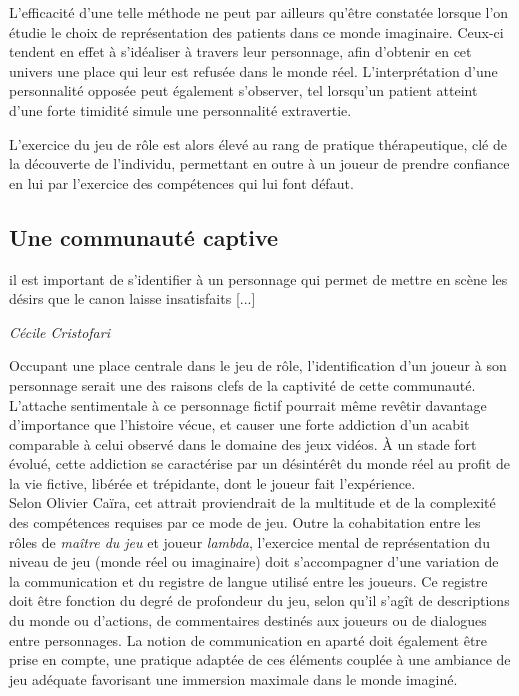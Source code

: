 L'efficacité d'une telle méthode ne peut par ailleurs qu'être constatée lorsque l'on étudie le choix de représentation des patients dans ce monde imaginaire. Ceux-ci tendent en effet à s'idéaliser à travers leur personnage, afin d'obtenir en cet univers une place qui leur est refusée dans le monde réel. L'interprétation d'une personnalité opposée peut également s'observer, tel lorsqu'un patient atteint d'une forte timidité simule une personnalité extravertie.

L'exercice du jeu de rôle est alors élevé au rang de pratique thérapeutique, clé de la découverte de l'individu, permettant en outre à un joueur de prendre confiance en lui par l'exercice des compétences qui lui font défaut.



\subsection{Une communauté captive}

\begin{shadequote}
[...] il est important de s’identifier à un personnage qui permet de mettre en scène les désirs que le canon laisse insatisfaits [...]
\par\emph{C{\'e}cile Cristofari}
\end{shadequote}

Occupant une place centrale dans le jeu de rôle, l'identification d'un joueur à son personnage serait une des raisons clefs de la captivité de cette communauté. L'attache sentimentale à ce personnage fictif pourrait même revêtir davantage d'importance que l'histoire vécue, et causer une forte addiction d'un acabit comparable à celui observé dans le domaine des jeux vidéos. \`A un stade fort évolué, cette addiction se caractérise par un désintérêt du monde réel au profit de la vie fictive, libérée et trépidante, dont le joueur fait l'expérience.\\


Selon Olivier Caïra\cite{caira2007jeux}, cet attrait proviendrait de la multitude et de la complexité des compétences requises par ce mode de jeu. Outre la cohabitation entre les rôles de \textit{maître du jeu} et joueur \textit{lambda}, l'exercice mental de représentation du niveau de jeu (monde réel ou imaginaire) doit s'accompagner d'une variation de la communication et du registre de langue utilisé entre les joueurs. Ce registre doit être fonction du degré de profondeur du jeu, selon qu'il s'agît de descriptions du monde ou d'actions, de commentaires destinés aux joueurs ou de dialogues entre personnages. La notion de communication en aparté doit également être prise en compte, une pratique adaptée de ces éléments couplée à une ambiance de jeu adéquate favorisant une immersion maximale dans le monde imaginé.

